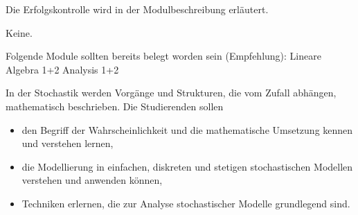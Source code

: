 \begin{course}

\setdoclanguagegerman
{}


\courselevel{}
\courseinstructionlanguage{}

\coursehead


\label{cour_8037.dp_997}


\begin{styleenv}
\begin{assessment}
Die Erfolgskontrolle wird in der Modulbeschreibung erläutert.


\end{assessment}

\begin{conditions}Keine.\end{conditions}

\begin{recommendations}Folgende Module sollten bereits belegt worden sein (Empfehlung):\newline
Lineare Algebra 1+2\newline
Analysis 1+2

\end{recommendations}
\end{styleenv}

\begin{learningoutcomes}
In der Stochastik werden Vorgänge und Strukturen, die vom Zufall abhängen, mathematisch beschrieben. Die Studierenden sollen

 \begin{itemize}\item den Begriff der Wahrscheinlichkeit und die mathematische Umsetzung kennen und verstehen lernen,  \item die Modellierung in einfachen, diskreten und stetigen stochastischen Modellen verstehen und anwenden können,  \item Techniken erlernen, die zur Analyse stochastischer Modelle grundlegend sind.  \end{itemize}
\end{learningoutcomes}


\end{course}
